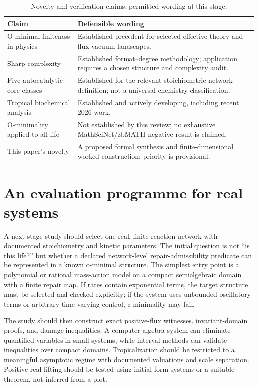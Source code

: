 \documentclass[11pt,a4paper]{article}
\theoremstyle{definition}
\theoremstyle{remark}
\begin{document}
\begin{table}[H]
\centering\small
\caption{Novelty and verification claims: permitted wording at this stage.}
\begin{tabularx}{\textwidth}{@{}p{}p{}@{}}
\toprule
Claim & Defensible wording \\
\midrule
O-minimal finiteness in physics & Established precedent for selected effective-theory and flux-vacuum landscapes.\\
Sharp complexity & Established format--degree methodology; application requires a chosen structure and complexity audit.\\
Five autocatalytic core classes & Established for the relevant stoichiometric network definition; not a universal chemistry classification.\\
Tropical biochemical analysis & Established and actively developing, including recent 2026 work.\\
O-minimality applied to all life & Not established by this review; no exhaustive MathSciNet/zbMATH negative result is claimed.\\
This paper's novelty & A proposed formal synthesis and finite-dimensional worked construction; priority is provisional.\\
\bottomrule
\end{tabularx}
\end{table}

\section{An evaluation programme for real systems}
A next-stage study should select one real, finite reaction network with documented stoichiometry and kinetic parameters. The initial question is not ``is this life?'' but whether a declared network-level repair-admissibility predicate can be represented in a known o-minimal structure. The simplest entry point is a polynomial or rational mass-action model on a compact semialgebraic domain with a finite repair map. If rates contain exponential terms, the target structure must be selected and checked explicitly; if the system uses unbounded oscillatory terms or arbitrary time-varying control, o-minimality may fail.

The study should then construct exact positive-flux witnesses, invariant-domain proofs, and damage inequalities. A computer algebra system can eliminate quantified variables in small systems, while interval methods can validate inequalities over compact domains. Tropicalization should be restricted to a meaningful asymptotic regime with documented valuations and scale separation. Positive real lifting should be tested using initial-form systems or a suitable theorem, not inferred from a plot.
\end{document}
